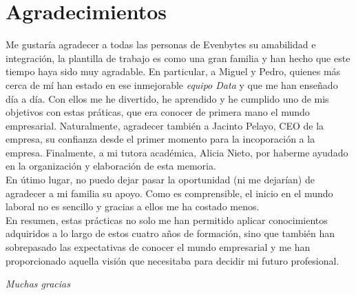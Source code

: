 \chapter*{Agradecimientos}
%
%
Me gustaría agradecer a todas las personas de Evenbytes su amabilidad e integración, la plantilla de trabajo es como una gran familia y han hecho que este tiempo haya sido muy agradable. En particular, a Miguel y Pedro, quienes más cerca de mí han estado en ese inmejorable \textit{equipo Data} y que me han enseñado día a día. Con ellos me he divertido, he aprendido y he cumplido uno de mis objetivos con estas práticas, que era conocer de primera mano el mundo empresarial. Naturalmente, agradecer también a Jacinto Pelayo, CEO de la empresa, su confianza desde el primer momento para la incoporación a la empresa. Finalmente, a mi tutora académica, Alicia Nieto, por haberme ayudado en la organización y elaboración de esta memoria.\\

En útimo lugar, no puedo dejar pasar la oportunidad (ni me dejarían) de agradecer a mi familia su apoyo. Como es comprensible, el inicio en el mundo laboral no es sencillo y gracias a ellos me ha costado menos.\\

En resumen, estas prácticas no solo me han permitido aplicar conocimientos adquiridos a lo largo de estos cuatro años de formación, sino que también han sobrepasado las expectativas de conocer el mundo empresarial y me han proporcionado aquella visión que necesitaba para decidir mi futuro profesional.

\begin{flushright}
    \textit{Muchas gracias}
\end{flushright}